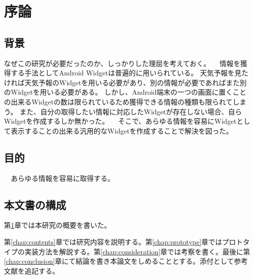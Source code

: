 \chapter{序論}
\label{chap:introduction}
\section{背景}
なぜこの研究が必要だったのか、しっかりした理屈を考えておく。
　情報を獲得する手法としてAndroid Widgetは普遍的に用いられている。
天気予報を見たければ天気予報のWidgetを用いる必要があり、別の情報が必要であればまた別のWidgetを用いる必要がある。
しかし、Android端末の一つの画面に置くことの出来るWidgetの数は限られているため獲得できる情報の種類も限られてしまう。
また、自分の取得したい情報に対応したWidgetが存在しない場合、自らWidgetを作成するしか無かった。
　そこで、あらゆる情報を容易にWidgetとして表示することの出来る汎用的なWidgetを作成することで解決を図った。

\section{目的}
　あらゆる情報を容易に取得する。

\section{本文書の構成}
第\ref{chap:introduction}章では本研究の概要を書いた。

第\ref{chap:contents}章では研究内容を説明する。第\ref{chap:prototype}章ではプロトタイプの実装方法を解説する。第\ref{chap:consideration}章では考察を書く。最後に第\ref{chap:conclusion}章にて結論を書き本論文をしめることとする。添付として参考文献を追記する。
